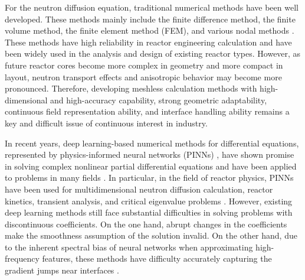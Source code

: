 \documentclass[final,3p,times,sort&compress]{elsarticle}
\begin{document}
For the neutron diffusion equation, traditional numerical methods have been well developed. These methods mainly include the finite difference method, the finite volume method, the finite element method (FEM), and various nodal methods \cite{mohamedhamada2022higher, li2024research, zong2023multithreaded, yin2024efficient}. These methods have high reliability in reactor engineering calculation and have been widely used in the analysis and design of existing reactor types. However, as future reactor cores become more complex in geometry and more compact in layout, neutron transport effects and anisotropic behavior may become more pronounced. Therefore, developing meshless calculation methods with high-dimensional and high-accuracy capability, strong geometric adaptability, continuous field representation ability, and interface handling ability remains a key and difficult issue of continuous interest in industry.

In recent years, deep learning-based numerical methods for differential equations, represented by physics-informed neural networks (PINNs) \cite{raissi2019physicsinformed}, have shown promise in solving complex nonlinear partial differential equations and have been applied to problems in many fields \cite{karniadakis2021physicsinformed,luo2025physicsinformed}. In particular, in the field of reactor physics, PINNs have been used for multidimensional neutron diffusion calculation, reactor kinetics, transient analysis, and critical eigenvalue problems \cite{elhareef2021physicsinformed, antonello2023physics, li2024new,xie2021neural,liu2022solving,schiassi2022physicsinformed,prantikos2023physicsinformed,liu2024deep,lee2026development,zeng2026application, liu2026frequency}. However, existing deep learning methods still face substantial difficulties in solving problems with discontinuous coefficients. On the one hand, abrupt changes in the coefficients make the smoothness assumption of the solution invalid. On the other hand, due to the inherent spectral bias of neural networks when approximating high-frequency features, these methods have difficulty accurately capturing the gradient jumps near interfaces \cite{haghighat2021physicsinformed}.
\end{document}
